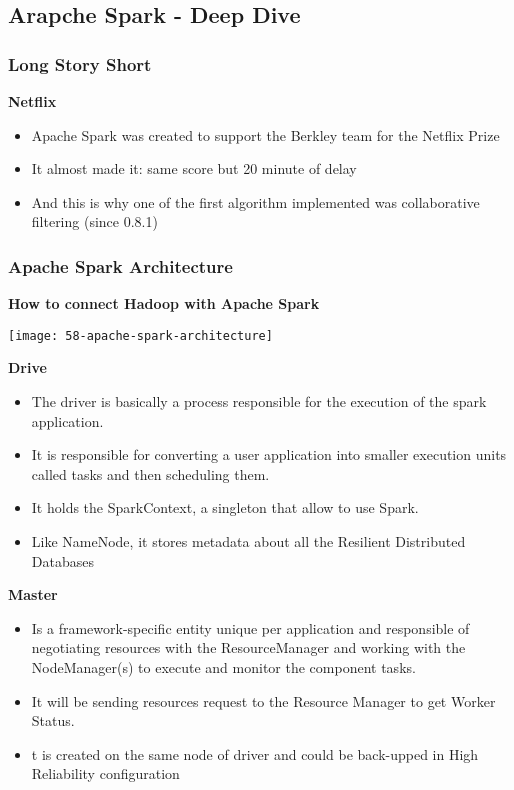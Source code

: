 \subsection{Arapche Spark - Deep Dive}

\subsubsection{Long Story Short}
\textbf{Netflix}
\begin{itemize}
	\item Apache Spark was created to support the Berkley team for the Netflix Prize
	\item It almost made it: same score but 20 minute of delay
	\item And this is why one of the first algorithm implemented was collaborative filtering (since 0.8.1)
\end{itemize}

\subsubsection{Apache Spark Architecture}

\textbf{How to connect Hadoop with Apache Spark}

\begin{center}
\texttt{[image: 58-apache-spark-architecture]}
\end{center}
 
\textbf{Drive}
\begin{itemize}
	\item The driver is basically a process responsible for the execution of the spark application. 
	\item It is responsible for converting a user application into smaller execution units called tasks and then scheduling them.
	\item It holds the SparkContext, a singleton that allow to use Spark.
	\item Like NameNode, it stores metadata about all the Resilient Distributed Databases
\end{itemize}

\textbf{Master}
\begin{itemize}
	\item Is a framework-specific entity unique per application and responsible of negotiating resources with the ResourceManager and working with the NodeManager(s) to execute and monitor the component tasks.
	\item It will be sending resources request to the Resource Manager to get Worker Status.
	\item t is created on the same node of driver and could be back-upped in High Reliability configuration
\end{itemize}

